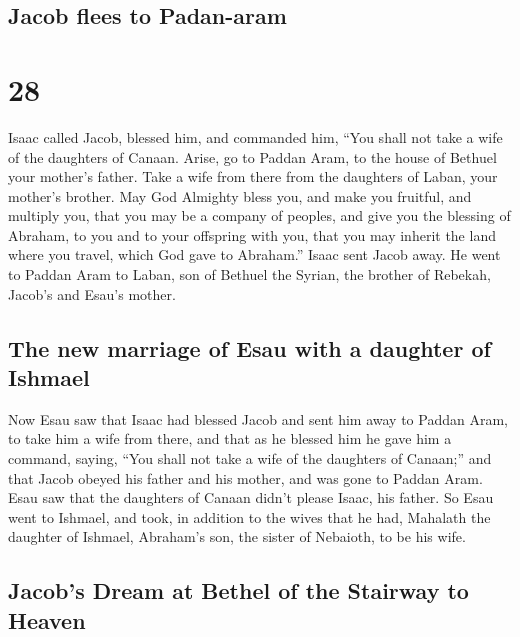 \hypertarget{jacob-flees-to-padan-aram}{%
\subsection{Jacob flees to Padan-aram}\label{jacob-flees-to-padan-aram}}

\hypertarget{section-27}{%
\section{28}\label{section-27}}

 Isaac called Jacob, blessed him, and commanded him, ``You
shall not take a wife of the daughters of Canaan.  Arise,
go to Paddan Aram, to the house of Bethuel your mother's father. Take a
wife from there from the daughters of Laban, your mother's brother.
 May God Almighty bless you, and make you fruitful, and
multiply you, that you may be a company of peoples,  and
give you the blessing of Abraham, to you and to your offspring with you,
that you may inherit the land where you travel, which God gave to
Abraham.''  Isaac sent Jacob away. He went to Paddan Aram
to Laban, son of Bethuel the Syrian, the brother of Rebekah, Jacob's and
Esau's mother.

\hypertarget{the-new-marriage-of-esau-with-a-daughter-of-ishmael}{%
\subsection{The new marriage of Esau with a daughter of
Ishmael}\label{the-new-marriage-of-esau-with-a-daughter-of-ishmael}}

 Now Esau saw that Isaac had blessed Jacob and sent him
away to Paddan Aram, to take him a wife from there, and that as he
blessed him he gave him a command, saying, ``You shall not take a wife
of the daughters of Canaan;''  and that Jacob obeyed his
father and his mother, and was gone to Paddan Aram.  Esau
saw that the daughters of Canaan didn't please Isaac, his father.
 So Esau went to Ishmael, and took, in addition to the
wives that he had, Mahalath the daughter of Ishmael, Abraham's son, the
sister of Nebaioth, to be his wife.

\hypertarget{jacobs-dream-at-bethel-of-the-stairway-to-heaven}{%
\subsection{Jacob's Dream at Bethel of the Stairway to
Heaven}\label{jacobs-dream-at-bethel-of-the-stairway-to-heaven}}

